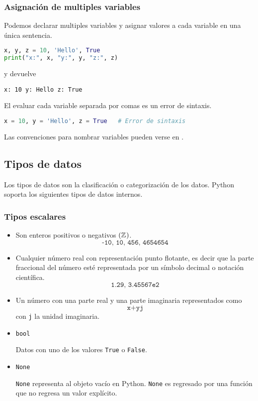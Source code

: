     \subsubsection{Asignación de multiples variables}\label{subsubsec: assign_var}
    Podemos declarar multiples variables y asignar valores a cada variable en una única sentencia.
    \begin{lstlisting}[language={python}]
x, y, z = 10, 'Hello', True
print("x:", x, "y:", y, "z:", z)
    \end{lstlisting}
    y devuelve
    \begin{lstlisting}[language={[latex]tex}]
x: 10 y: Hello z: True
    \end{lstlisting}
    El evaluar cada variable separada por comas es un error de sintaxis.
    \begin{lstlisting}[language={python}]
x = 10, y = 'Hello', z = True   # Error de sintaxis
    \end{lstlisting}
    Las convenciones para nombrar variables pueden verse en .
    \subsection{Tipos de datos}\label{subsec: tipos_datos}
    Los tipos de datos son la clasificación o categorización de los datos. Python soporta los siguientes tipos de datos internos.
    \subsubsection{Tipos escalares}\label{subsubsec: dato_escalar}
    \begin{itemize}
        \item{}\par
        Son enteros positivos o negativos $(\mathbb{Z}^{})$.
        \[\texttt{-10, 10, 456, 4654654}\]
        \item{}\par
        Cualquier número real con representación punto flotante, es decir que la parte fraccional del número esté representada por un símbolo decimal o notación científica.
         \[\texttt{1.29, 3.45567e2}\]
         \item {}\par 
         Un número con una parte real y una parte imaginaria representados como
         \[\texttt{x+yj}\]
         con \texttt{j} la unidad imaginaria.
         \item \texttt{bool}\par 
         Datos con uno de los valores \texttt{True} o \texttt{False}. 
         \item \texttt{None}\par 
         \texttt{None} representa al objeto vacío en Python. \texttt{None} es regresado por una función que no regresa un valor explícito.
    \end{itemize}
